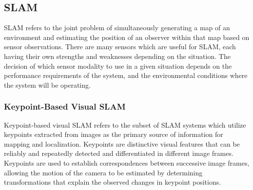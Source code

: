 \subsection{SLAM}

SLAM refers to the joint problem of simultaneously generating a map of an environment and estimating the position of an observer within that map based on sensor observations. There are many sensors which are useful for SLAM, each having their own strengths and weaknesses depending on the situation. The decision of which sensor modality to use in a given situation depends on the performance requirements of the system, and the environmental conditions where the system will be operating.

\subsubsection{Keypoint-Based Visual SLAM}

Keypoint-based visual SLAM refers to the subset of SLAM systems which utilize keypoints extracted from images as the primary source of information for mapping and localization. Keypoints are distinctive visual features that can be reliably and repeatedly detected and differentiated in different image frames. Keypoints are used to establish correspondences between successive image frames, allowing the motion of the camera to be estimated by determining transformations that explain the observed changes in keypoint positions.

% 


